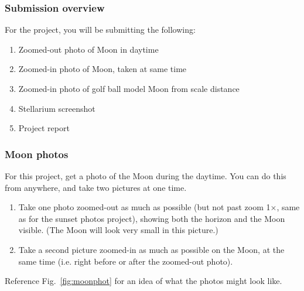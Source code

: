 \documentclass[main.tex]{subfiles}
\begin{document}
\subsubsection{Submission overview}
For the project, you will be submitting the following:
\begin{enumerate}
\item Zoomed-out photo of Moon in daytime
\item Zoomed-in photo of Moon, taken at same time
\item Zoomed-in photo of golf ball model Moon from scale distance
\item Stellarium screenshot
\item Project report
\end{enumerate}

\subsubsection{Moon photos}
For this project, get a photo of the Moon during the daytime. You can do this from anywhere, and take two pictures at one time.
\begin{enumerate}
\item Take one photo zoomed-out as much as possible (but not past zoom 1$\times$, same as for the sunset photos project), showing both the horizon and the Moon visible. (The Moon will look very small in this picture.)
\item Take a second picture zoomed-in as much as possible on the Moon, at the same time (i.e. right before or after the zoomed-out photo).
\end{enumerate}

Reference Fig.~\ref{fig:moonphot} for an idea of what the photos might look like.
\end{document}
